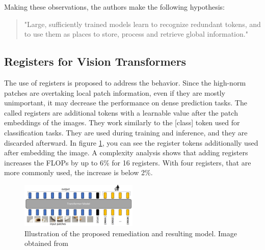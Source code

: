 \documentclass[conference]{IEEEtran}
\begin{document}
  Making these observations, the authors make the following hypothesis:
  \begin{quote}
    "Large, sufficiently trained models learn to recognize redundant tokens, and to use them as places to store, process and retrieve global information." \cite{registers}
  \end{quote}

  \subsection{Registers for Vision Transformers}
  \label{sec:registers:registers}


  The use of registers is proposed to address the behavior. Since the high-norm patches are overtaking local patch information, even if they are mostly unimportant, it may decrease the performance on dense prediction tasks. The called registers are additional tokens with a learnable value after the patch embeddings of the images. They work similarly to the [class] token used for classification tasks. They are used during training and inference, and they are discarded afterward. In figure \ref{fig:register-architecture}, you can see the register tokens additionally used after embedding the image. A complexity analysis shows that adding registers increases the FLOPs by up to 6\% for 16 registers. With four registers, that are more commonly used, the increase is below 2\%.

  \begin{figure}
    \centering
    \includegraphics[width=0.5\textwidth]{figures/register-architecture.png}
    \caption{Illustration of the proposed remediation and resulting model. Image obtained from \cite{registers}}
    \label{fig:register-architecture}
  \end{figure}
\end{document}
